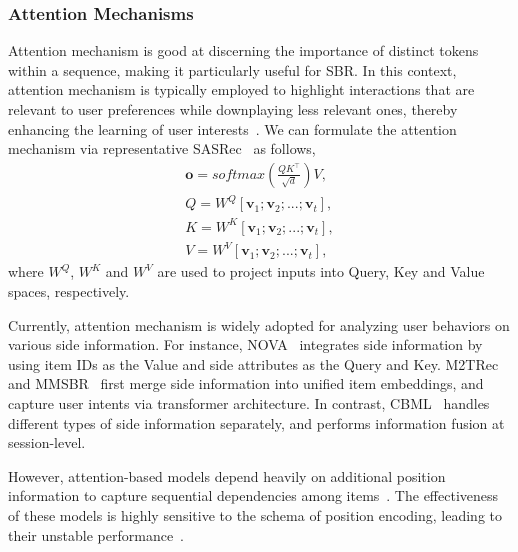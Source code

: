 \documentclass[lettersize,journal]{IEEEtran}
\begin{document}
\subsubsection{Attention Mechanisms}
Attention mechanism is good at discerning the importance of distinct tokens within a sequence, making it particularly useful for SBR. In this context, attention mechanism is typically employed to highlight interactions that are relevant to user preferences while downplaying less relevant ones, thereby enhancing the learning of user interests~\cite{SASRec,STAMP,BERT4Rec}. We can formulate the attention mechanism via representative SASRec~\cite{SASRec} as follows,
\begin{equation}
    \begin{split}
         \textbf{o} = softmax(\frac{QK^{\top}}{\sqrt{d}})V, \\
         Q = W^Q[\textbf{v}_1; \textbf{v}_2; ...; \textbf{v}_t],\\
         K = W^K[\textbf{v}_1; \textbf{v}_2; ...; \textbf{v}_t],\\
         V = W^V[\textbf{v}_1; \textbf{v}_2; ...; \textbf{v}_t],
    \end{split}
\end{equation}
where $W^Q$, $W^K$ and $W^V$ are used to project inputs into Query, Key and Value spaces, respectively. 


Currently, attention mechanism is widely adopted for analyzing user behaviors on various side information. For instance, NOVA~\cite{liu@AAAI2021} integrates side information by using item IDs as the Value and side attributes as the Query and Key. M2TRec~\cite{Shalaby@RecSys2022} and MMSBR~\cite{MMSBR} first merge side information into unified item embeddings, and capture user intents via transformer architecture.  In contrast, CBML~\cite{song@CIKM2021} handles different types of side information separately, and performs information fusion at session-level.

However, attention-based models depend heavily on additional position information to capture sequential dependencies among items~\cite{ludewig@UMUAI2020,Wang@CS2022}. The effectiveness of these models is highly sensitive to the schema of position encoding, leading to their unstable performance~\cite{Qiu@TOIS2021}.
\end{document}
